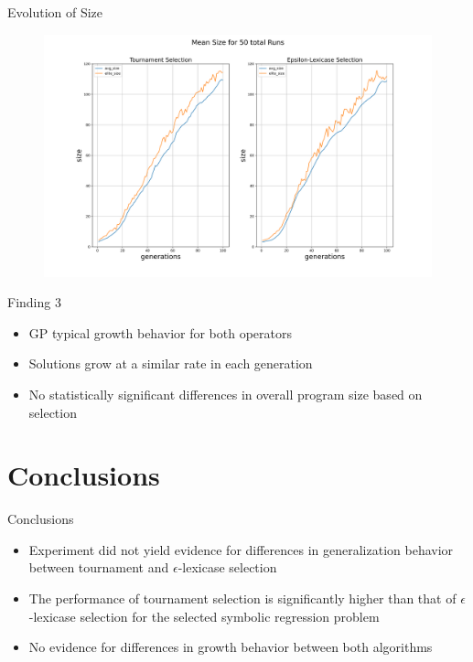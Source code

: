 \documentclass[
  ignorenonframetext,
]{beamer}
\providecommand{\tightlist}{%
  \setlength{\itemsep}{0pt}\setlength{\parskip}{0pt}}
\begin{document}
\begin{frame}{Evolution of Size}
\protect\hypertarget{evolution-of-size}{}
\begin{figure}
\centering
\includegraphics{../plots/size_subplotted.png}
\end{figure}
\end{frame}

\begin{frame}{Finding 3}
\protect\hypertarget{finding-3}{}
\begin{itemize}
\tightlist
\item
  GP typical growth behavior for both operators
\item
  Solutions grow at a similar rate in each generation
\item
  No statistically significant differences in overall program size based
  on selection
\end{itemize}
\end{frame}

\hypertarget{conclusions}{%
\section{Conclusions}\label{conclusions}}

\begin{frame}{Conclusions}
\begin{itemize}
\tightlist
\item
  Experiment did not yield evidence for differences in generalization
  behavior between tournament and \(\epsilon\)-lexicase selection
\item
  The performance of tournament selection is significantly higher than
  that of \(\epsilon\)-lexicase selection for the selected symbolic
  regression problem
\item
  No evidence for differences in growth behavior between both algorithms
\end{itemize}
\end{frame}
\end{document}
